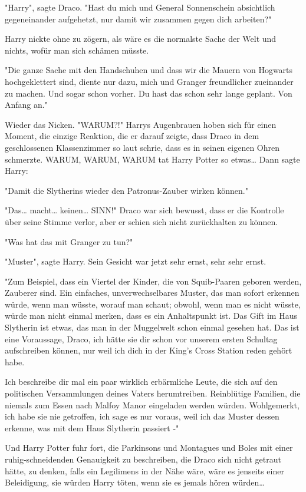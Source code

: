 {"Harry", sagte Draco. "Hast du mich und General Sonnenschein absichtlich gegeneinander aufgehetzt, nur damit wir zusammen gegen dich arbeiten?"

Harry nickte ohne zu zögern, als wäre es die normalste Sache der Welt und nichts, wofür man sich schämen müsste.

"Die ganze Sache mit den Handschuhen und dass wir die Mauern von Hogwarts hochgeklettert sind, diente nur dazu, mich und Granger freundlicher zueinander zu machen. Und sogar schon vorher. Du hast das schon sehr lange geplant. Von Anfang an."

Wieder das Nicken. "WARUM?!" Harrys Augenbrauen hoben sich für einen Moment, die einzige Reaktion, die er darauf zeigte, dass Draco in dem geschlossenen Klassenzimmer so laut schrie, dass es in seinen eigenen Ohren schmerzte. WARUM, WARUM, WARUM tat Harry Potter so etwas… Dann sagte Harry:

"Damit die Slytherins wieder den Patronus-Zauber wirken können."

"Das… macht… keinen… SINN!" Draco war sich bewusst, dass er die Kontrolle über seine Stimme verlor, aber er schien sich nicht zurückhalten zu können.

"Was hat das mit Granger zu tun?"

"Muster", sagte Harry. Sein Gesicht war jetzt sehr ernst, sehr sehr ernst.

"Zum Beispiel, dass ein Viertel der Kinder, die von Squib-Paaren geboren werden, Zauberer sind. Ein einfaches, unverwechselbares Muster, das man sofort erkennen würde, wenn man wüsste, worauf man schaut; obwohl, wenn man es nicht wüsste, würde man nicht einmal merken, dass es ein Anhaltspunkt ist. Das Gift im Haus Slytherin ist etwas, das man in der Muggelwelt schon einmal gesehen hat. Das ist eine Voraussage, Draco, ich hätte sie dir schon vor unserem ersten Schultag aufschreiben können, nur weil ich dich in der King's Cross Station reden gehört habe.

Ich beschreibe dir mal ein paar wirklich erbärmliche Leute, die sich auf den politischen Versammlungen deines Vaters herumtreiben. Reinblütige Familien, die niemals zum Essen nach Malfoy Manor eingeladen werden würden. Wohlgemerkt, ich habe sie nie getroffen, ich sage es nur voraus, weil ich das Muster dessen erkenne, was mit dem Haus Slytherin passiert -"

Und Harry Potter fuhr fort, die Parkinsons und Montagues und Boles mit einer ruhig-schneidenden Genauigkeit zu beschreiben, die Draco sich nicht getraut hätte, zu denken, falls ein Legilimens in der Nähe wäre, wäre es jenseits einer Beleidigung, sie würden Harry töten, wenn sie es jemals hören würden…

}
